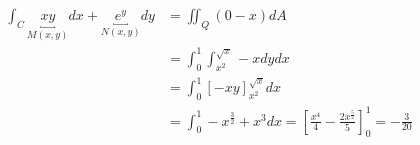 \documentclass{article}
\numberwithin{equation}{subsection} %
\begin{document}
\begin{equation}
    \begin{split}
        \int_C \underbracket{xy}_{M(x,y)}dx + \underbracket{e^y}_{N(x,y)}dy &= \iint_Q (0-x)dA \\
        &= \int_0^1 \int_{x^2}^{\sqrt{x}}-xdydx \\
        &= \int_0^1 \left[ -xy\right]_{x^2}^{\sqrt{x}} dx\\
        &= \int_0^1 -x^{\frac{3}{2}} + x^3 dx = \left[ \frac{x^4}{4}-\frac{2x^{\frac{5}{2}}}{5} \right]_0^1 = -\frac{3}{20}
    \end{split}
\end{equation}








\end{document}
